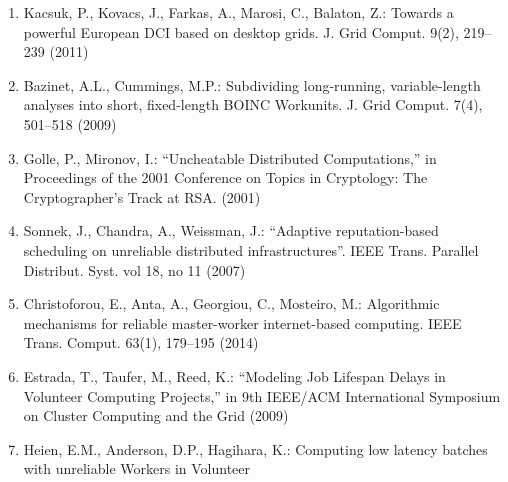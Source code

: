 \documentclass[
]{article}
\begin{document}
\begin{enumerate}
  Visegradi, A., Kovacs, J., Kacsuk, P.: Efficient extension of gLite
  VOs with BOINC based desktop grids. Futur. Gener. Comput. Syst. 32,
  13--23 (2014)\\
\item
  Kacsuk, P., Kovacs, J., Farkas, A., Marosi, C., Balaton, Z.: Towards a
  powerful European DCI based on desktop grids. J. Grid Comput. 9(2),
  219--239 (2011)\\
\item
  Bazinet, A.L., Cummings, M.P.: Subdividing long-running,
  variable-length analyses into short, fixed-length BOINC Workunits. J.
  Grid Comput. 7(4), 501--518 (2009)\\
\item
  Golle, P., Mironov, I.: ``Uncheatable Distributed Computations,'' in
  Proceedings of the 2001 Conference on Topics in Cryptology: The
  Cryptographer's Track at RSA. (2001)\\
\item
  Sonnek, J., Chandra, A., Weissman, J.: ``Adaptive reputation-based
  scheduling on unreliable distributed infrastructures''. IEEE Trans.
  Parallel Distribut. Syst. vol 18, no 11 (2007)\\
\item
  Christoforou, E., Anta, A., Georgiou, C., Mosteiro, M.: Algorithmic
  mechanisms for reliable master-worker internet-based computing. IEEE
  Trans. Comput. 63(1), 179--195 (2014)\\
\item
  Estrada, T., Taufer, M., Reed, K.: ``Modeling Job Lifespan Delays in
  Volunteer Computing Projects,'' in 9th IEEE/ACM International
  Symposium on Cluster Computing and the Grid (2009)\\
\item
  Heien, E.M., Anderson, D.P., Hagihara, K.: Computing low latency
  batches with unreliable Workers in Volunteer
\end{enumerate}
\end{document}
